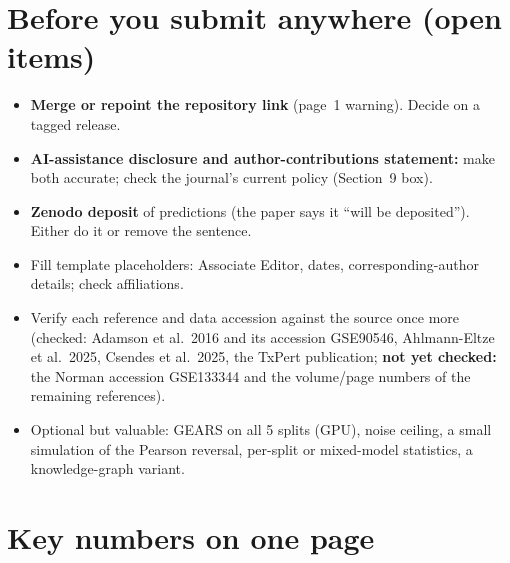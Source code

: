 \documentclass[10.5pt]{article}
\begin{document}
\section{Before you submit anywhere (open items)}
\begin{itemize}
\item \textbf{Merge or repoint the repository link} (page~1 warning). Decide on a tagged release.
\item \textbf{AI-assistance disclosure and author-contributions statement:} make both accurate; check the
journal's current policy (Section~9 box).
\item \textbf{Zenodo deposit} of predictions (the paper says it ``will be deposited''). Either do it or remove
the sentence.
\item Fill template placeholders: Associate Editor, dates, corresponding-author details; check affiliations.
\item Verify each reference and data accession against the source once more (checked: Adamson et al.\ 2016 and its
accession GSE90546, Ahlmann-Eltze et al.\ 2025, Csendes et al.\ 2025, the TxPert publication; \textbf{not yet
checked:} the Norman accession GSE133344 and the volume/page numbers of the remaining references).
\item Optional but valuable: GEARS on all 5 splits (GPU), noise ceiling, a small simulation of the Pearson
reversal, per-split or mixed-model statistics, a knowledge-graph variant.
\end{itemize}

\appendix
\section{Key numbers on one page}
\end{document}

